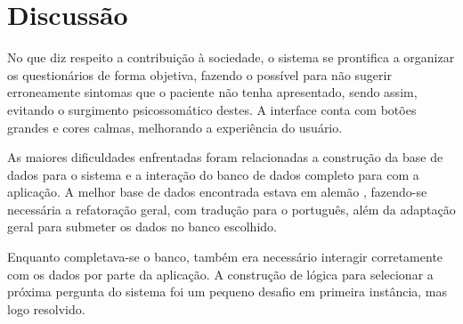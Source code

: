 \section{Discussão}

No que diz respeito a contribuição à sociedade, o sistema se prontifica a organizar os questionários de forma objetiva, fazendo o possível para não sugerir erroneamente sintomas que o paciente não tenha apresentado, sendo assim, evitando o surgimento psicossomático destes.
A interface conta com botões grandes e cores calmas, melhorando a experiência do usuário.

As maiores dificuldades enfrentadas foram relacionadas a construção da base de dados para o sistema e a interação do banco de dados completo para com a aplicação.
A melhor base de dados encontrada estava em alemão \cite{leander}, fazendo-se necessária a refatoração geral, com tradução para o português, além da adaptação geral para submeter os dados no banco escolhido.

Enquanto completava-se o banco, também era necessário interagir corretamente com os dados por parte da aplicação. A construção de lógica para selecionar a próxima pergunta do sistema foi um pequeno desafio em primeira instância, mas logo resolvido.
